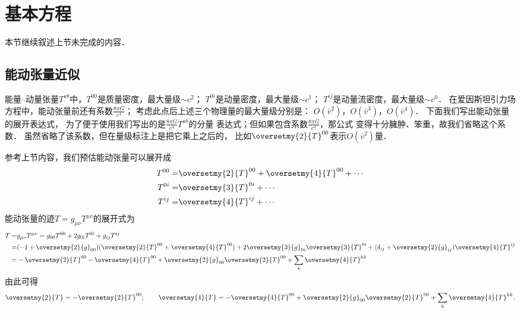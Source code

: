 \section{基本方程}
本节继续叙述上节未完成的内容．

\subsection{能动张量近似}
能量--动量张量$T^{ab}$中，$T^{00}$是质量密度，最大量级$\sim  c^2$；
$T^{0i}$是动量密度，最大量级$\sim  c^1$；
$T^{ij}$是动量流密度，最大量级$\sim  c^0$．
在爱因斯坦引力场方程中，能动张量前还有系数$\frac{8\pi G}{c^4}$；
考虑此点后上述三个物理量的最大量级分别是：
$O(\bar{v}^2)$，$O(\bar{v}^3)$，$O(\bar{v}^4)$．
下面我们写出能动张量的展开表达式，
为了便于使用我们写出的是$\frac{8\pi G}{c^4}T^{ab}$的分量
表达式；但如果包含系数$\frac{8\pi G}{c^4}$，那公式
变得十分臃肿、笨重，故我们省略这个系数．
虽然省略了该系数，但在量级标注上是把它乘上之后的，
比如$\oversetmy{2}{T}^{00}$表示$O(\bar{v}^2)$量．

参考上节内容，我们预估能动张量可以展开成
\begin{subequations}
    \begin{align}
        T^{00} =& \oversetmy{2}{T}^{00} + \oversetmy{4}{T}^{00} + \cdots \\
        T^{0i} =& \oversetmy{3}{T}^{0i} + \cdots \\
        T^{ij} =& \oversetmy{4}{T}^{ij} + \cdots
    \end{align}
\end{subequations}
能动张量的迹$T=g_{\mu\nu}T^{\mu\nu}$的展开式为
\begin{align*}
    T=& g_{\mu\nu}T^{\mu\nu}=
    g_{00}T^{00}+2g_{0i}T^{0i}+g_{ij}T^{ij} \\
    =&(-1 +\oversetmy{2}{g}_{00} ) (\oversetmy{2}{T}^{00} + \oversetmy{4}{T}^{00})
    +2 \oversetmy{3}{g}_{0i} \oversetmy{3}{T}^{0i}
    +(\delta_{ij}  +\oversetmy{2}{g}_{ij}) \oversetmy{4}{T}^{ij} \\
    =&-\oversetmy{2}{T}^{00} -\oversetmy{4}{T}^{00} +\oversetmy{2}{g}_{00}\oversetmy{2}{T}^{00}
     +\sum_{k}\oversetmy{4}{T}^{kk}
\end{align*}
由此可得
\begin{equation}
    \oversetmy{2}{T} = -\oversetmy{2}{T}^{00}; \qquad
    \oversetmy{4}{T} = -\oversetmy{4}{T}^{00}
      +\oversetmy{2}{g}_{00}\oversetmy{2}{T}^{00}
      +\sum_{k}\oversetmy{4}{T}^{kk}  .
\end{equation}

